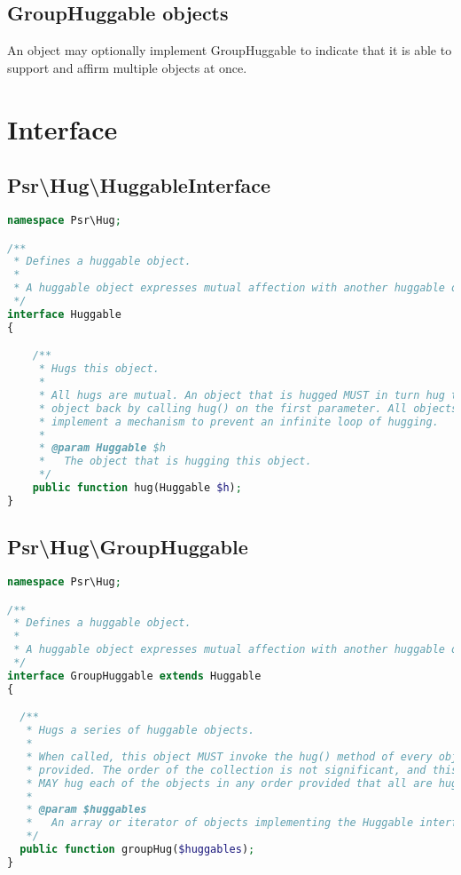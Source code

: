 \subsection{GroupHuggable objects}

\begin{compactenum}
\item An object may optionally implement GroupHuggable to indicate that it is able to support and affirm multiple objects at once.
\end{compactenum}

\section{Interface}


\subsection{Psr\textbackslash Hug\textbackslash HuggableInterface}



\begin{lstlisting}[language=PHP]
namespace Psr\Hug;

/**
 * Defines a huggable object.
 *
 * A huggable object expresses mutual affection with another huggable object.
 */
interface Huggable
{

    /**
     * Hugs this object.
     *
     * All hugs are mutual. An object that is hugged MUST in turn hug the other
     * object back by calling hug() on the first parameter. All objects MUST
     * implement a mechanism to prevent an infinite loop of hugging.
     *
     * @param Huggable $h
     *   The object that is hugging this object.
     */
    public function hug(Huggable $h);
}
\end{lstlisting}


\subsection{Psr\textbackslash Hug\textbackslash GroupHuggable}


\begin{lstlisting}[language=PHP]
namespace Psr\Hug;

/**
 * Defines a huggable object.
 *
 * A huggable object expresses mutual affection with another huggable object.
 */
interface GroupHuggable extends Huggable
{

  /**
   * Hugs a series of huggable objects.
   *
   * When called, this object MUST invoke the hug() method of every object
   * provided. The order of the collection is not significant, and this object
   * MAY hug each of the objects in any order provided that all are hugged.
   *
   * @param $huggables
   *   An array or iterator of objects implementing the Huggable interface.
   */
  public function groupHug($huggables);
}
\end{lstlisting}


